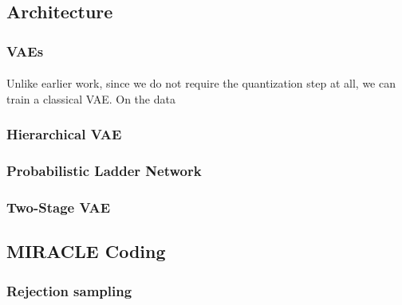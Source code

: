 \documentclass{article}
\begin{document}
\subsection{Architecture}
\subsubsection{VAEs}
\paragraph{}
Unlike earlier work, since we do not require the quantization step at all, we
can train a classical VAE. On the data

\subsubsection{Hierarchical VAE}
\paragraph{}

\subsubsection{Probabilistic Ladder Network}
\paragraph{}

\subsubsection{Two-Stage VAE}
\paragraph{}
\cite{dai2019diagnosing}

\subsection{MIRACLE Coding}
\paragraph{}
\cite{havasi2018minimal}

\subsubsection{Rejection sampling}
\paragraph{}
\cite{harsha2007communication}
\end{document}

